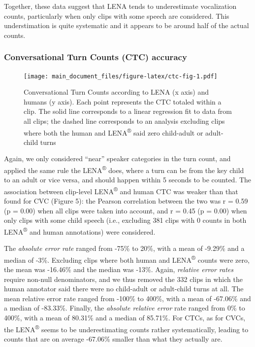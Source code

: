 \documentclass[english,table,man,floatsintext]{apa6}
\begin{document}
Together, these data suggest that LENA tends to underestimate
vocalization counts, particularly when only clips with some speech are
considered. This understimation is quite systematic and it appears to be
around half of the actual counts.

\subsubsection{Conversational Turn Counts (CTC)
accuracy}\label{conversational-turn-counts-ctc-accuracy}

\begin{figure}
\centering
\texttt{[image: main\_document\_files/figure-latex/ctc-fig-1.pdf]}
\caption{\label{fig:ctc-fig}Conversational Turn Counts according to LENA (x
axis) and humans (y axis). Each point represents the CTC totaled within
a clip. The solid line corresponds to a linear regression fit to data
from all clips; the dashed line corresponds to an analysis excluding
clips where both the human and LENA\textsuperscript{®} said zero
child-adult or adult-child turns}
\end{figure}

Again, we only considered \enquote{near} speaker categories in the turn
count, and applied the same rule the LENA\textsuperscript{®} does, where
a turn can be from the key child to an adult or vice versa, and should
happen within 5 seconds to be counted. The association between
clip-level LENA\textsuperscript{®} and human CTC was weaker than that
found for CVC (Figure 5): the Pearson correlation between the two was r
= 0.59 (p = 0.00) when all clips were taken into account, and r = 0.45
(p = 0.00) when only clips with some child speech (i.e., excluding 381
clips with 0 counts in both LENA\textsuperscript{®} and human
annotations) were considered.

The \emph{absolute error rate} ranged from -75\% to 20\%, with a mean of
-9.29\% and a median of -3\%. Excluding clips where both human and
LENA\textsuperscript{®} counts were zero, the mean was -16.46\% and the
median was -13\%. Again, \emph{relative error rates} require non-null
denominators, and we thus removed the 332 clips in which the human
annotator said there were no child-adult or adult-child turns at all.
The mean relative error rate ranged from -100\% to 400\%, with a mean of
-67.06\% and a median of -83.33\%. Finally, the \emph{absolute relative
error} rate ranged from 0\% to 400\%, with a mean of 80.31\% and a
median of 85.71\%. For CTCs, as for CVCs, the LENA\textsuperscript{®}
seems to be underestimating counts rather systematically, leading to
counts that are on average -67.06\% smaller than what they actually are.
\end{document}

